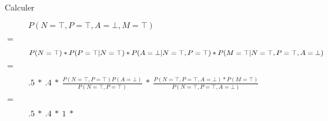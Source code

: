 \begin{description}
\item[Calculer] $P(N=\top,P=\top,A=\bot,M=\top)$
\item[$=$] $P(N=\top) * P(P=\top|N=\top) * P(A=\bot|N=\top,P=\top) * \linebreak P(M=\top|N=\top,P=\top,A=\bot)$
\item[$=$] $ .5\ *\ .4\ *\ \frac{P(N=\top,P=\top)P(A=\bot)}{P(N=\top,P=\top)}\ *\ \frac{P(N=\top,P=\top,A=\bot)*P(M=\top)}{P(N=\top,P=\top,A=\bot)}$
\item[$=$] $ .5\ *\ .4\ *\ 1\ *\ $
\end{description}

\pagebreak